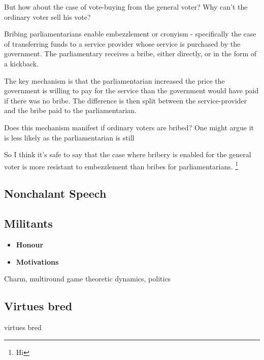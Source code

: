 But how about the case of vote-buying from the general voter? Why can't the ordinary voter sell his vote? 


Bribing parliamentarians enable embezzlement or cronyism - specifically the case of transferring funds to a service provider whose service is purchased by the government. The parliamentary receives a bribe, either directly, or in the form of a kickback.

The key mechanism is that the parliamentarian increased the price the government is willing to pay for the service than the government would have paid if there was no bribe. The difference is then split between the service-provider and the bribe paid to the parliamentarian.

Does this mechanism manifest if ordinary voters are bribed? One might argue it is less likely as the parliamentarian is still

So I think it's safe to say that the case where bribery is enabled for the general voter is more resistant to embezzlement than bribes for parliamentarians. \footnote{Hi}

\subsection{Nonchalant Speech}

\subsection{Militants}




\begin{itemize}
    \item \textbf{Honour}
    \item \textbf{Motivations}
\end{itemize}


Charm, multiround game theoretic dynamics, politics 


\subsection{Virtues bred}
virtues bred 






